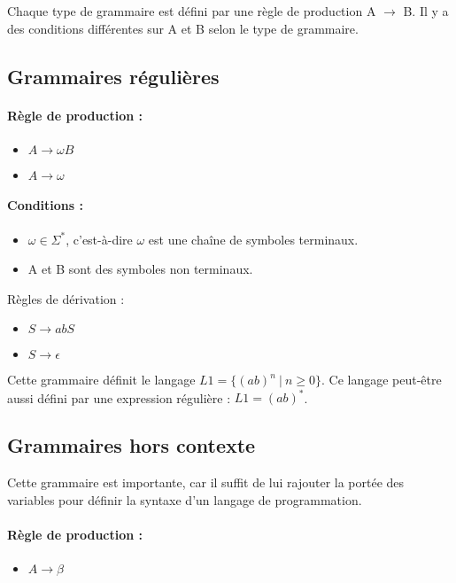 Chaque type de grammaire est défini par une règle de production A $\rightarrow
$ B. Il y a des conditions différentes sur A et B selon le type de
grammaire.

\subsection{Grammaires régulières}
\paragraph{Règle de production :}
\begin{itemize}
	\item $A \rightarrow \omega B$
	\item $A \rightarrow \omega$
\end{itemize}

\paragraph{Conditions :}
\begin{itemize}
	\item  $\omega \in \Sigma^*$, c'est-à-dire $\omega$ est une chaîne de symboles
	terminaux.
	\item A et B sont des symboles non terminaux.
\end{itemize}

\begin{myexem} Règles de dérivation :
	\begin{itemize}
		\item $S \rightarrow abS$
		\item $S \rightarrow \epsilon$
	\end{itemize}
	Cette grammaire définit le langage $L1 =
	\{(ab)^n \ | \ n \geq 0\}$. Ce langage peut-être aussi défini par une expression
	régulière : $L1 = (ab)^*$.
\end{myexem}

\subsection{Grammaires hors contexte}
Cette grammaire est importante, car il suffit de lui rajouter la portée des
variables pour définir la syntaxe d'un langage de programmation.

\paragraph{Règle de production :}
\begin{itemize}
	\item $A \rightarrow \beta$
\end{itemize}

